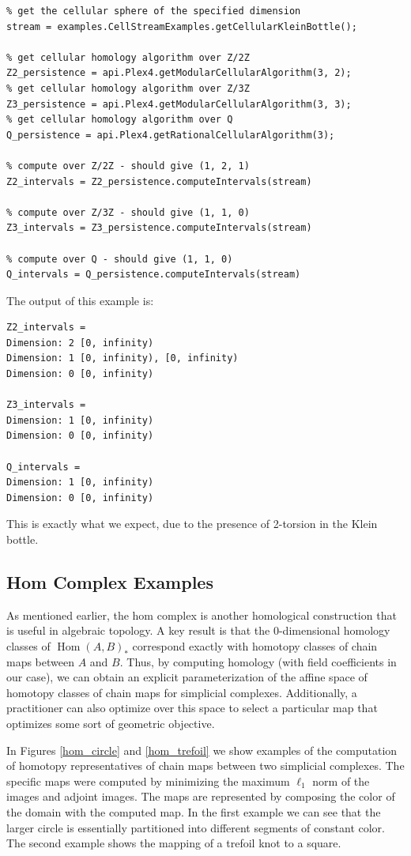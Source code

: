 \begin{verbatim}
% get the cellular sphere of the specified dimension
stream = examples.CellStreamExamples.getCellularKleinBottle();

% get cellular homology algorithm over Z/2Z
Z2_persistence = api.Plex4.getModularCellularAlgorithm(3, 2);
% get cellular homology algorithm over Z/3Z
Z3_persistence = api.Plex4.getModularCellularAlgorithm(3, 3);
% get cellular homology algorithm over Q
Q_persistence = api.Plex4.getRationalCellularAlgorithm(3);

% compute over Z/2Z - should give (1, 2, 1)
Z2_intervals = Z2_persistence.computeIntervals(stream)

% compute over Z/3Z - should give (1, 1, 0)
Z3_intervals = Z3_persistence.computeIntervals(stream)

% compute over Q - should give (1, 1, 0)
Q_intervals = Q_persistence.computeIntervals(stream)
\end{verbatim}
The output of this example is:
\begin{verbatim}
Z2_intervals =
Dimension: 2 [0, infinity)
Dimension: 1 [0, infinity), [0, infinity)
Dimension: 0 [0, infinity)
  
Z3_intervals =
Dimension: 1 [0, infinity)
Dimension: 0 [0, infinity)
 
Q_intervals =
Dimension: 1 [0, infinity)
Dimension: 0 [0, infinity)
\end{verbatim}
This is exactly what we expect, due to the presence of 2-torsion in the Klein bottle.

\subsection{Hom Complex Examples}

As mentioned earlier, the hom complex is another homological construction that is useful in algebraic topology. A key result is that the 0-dimensional homology classes of $\mathop{\mathrm{Hom}}(A,B)_*$ correspond exactly with homotopy classes of chain maps between $A$ and $B$. Thus, by computing homology (with field coefficients in our case), we can obtain an explicit parameterization of the affine space of homotopy classes of chain maps for simplicial complexes. Additionally, a practitioner can also optimize over this space to select a particular map that optimizes some sort of geometric objective.

In Figures \ref{hom_circle} and \ref{hom_trefoil} we show examples of the computation of homotopy representatives of chain maps between two simplicial complexes. The specific maps were computed by minimizing the maximum $\ell_1$ norm of the images and adjoint images. The maps are represented by composing the color of the domain with the computed map. In the first example we can see that the larger circle is essentially partitioned into different segments of constant color. The second example shows the mapping of a trefoil knot to a square.


